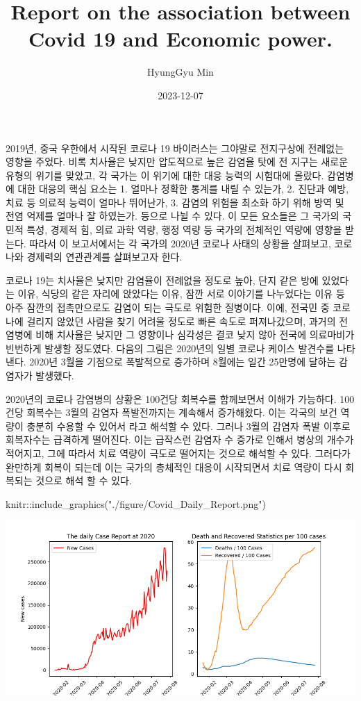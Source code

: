 \documentclass[
]{article}
\title{Report on the association between Covid 19 and Economic power.}
\author{HyungGyu Min}
\date{2023-12-07}
\newenvironment{Shaded}{\begin{snugshade}}{\end{snugshade}}
\newcommand{\FunctionTok}[1]{\textcolor[rgb]{0.00,0.00,0.00}{#1}}
\newcommand{\NormalTok}[1]{#1}
\newcommand{\SpecialCharTok}[1]{\textcolor[rgb]{0.00,0.00,0.00}{#1}}
\newcommand{\StringTok}[1]{\textcolor[rgb]{0.31,0.60,0.02}{#1}}
\begin{document}
\maketitle

2019년, 중국 우한에서 시작된 코로나 19 바이러스는 그야말로 전지구상에
전례없는 영향을 주었다. 비록 치사율은 낮지만 압도적으로 높은 감염율 탓에
전 지구는 새로운 유형의 위기를 맞았고, 각 국가는 이 위기에 대한 대응
능력의 시험대에 올랐다. 감염병에 대한 대응의 핵심 요소는 1. 얼마나
정확한 통계를 내릴 수 있는가, 2. 진단과 예방, 치료 등 의료적 능력이
얼마나 뛰어난가, 3. 감염의 위험을 최소화 하기 위해 방역 및 전염 억제를
얼마나 잘 하였는가. 등으로 나뉠 수 있다. 이 모든 요소들은 그 국가의
국민적 특성, 경제적 힘, 의료 과학 역량, 행정 역량 등 국가의 전체적인
역량에 영향을 받는다. 따라서 이 보고서에서는 각 국가의 2020년 코로나
사태의 상황을 살펴보고, 코로나와 경제력의 연관관계를 살펴보고자 한다.

코로나 19는 치사율은 낮지만 감염율이 전례없을 정도로 높아, 단지 같은
방에 있었다는 이유, 식당의 같은 자리에 앉았다는 이유, 잠깐 서로 이야기를
나누었다는 이유 등 아주 잠깐의 접촉만으로도 감염이 되는 극도로 위험한
질병이다. 이에, 전국민 중 코로나에 걸리지 않았던 사람을 찾기 어려울
정도로 빠른 속도로 퍼져나갔으며, 과거의 전염병에 비해 치사율은 낮지만 그
영향이나 심각성은 결코 낮지 않아 전국에 의료마비가 빈번하게 발생할
정도였다. 다음의 그림은 2020년의 일별 코로나 케이스 발견수를 나타낸다.
2020년 3월을 기점으로 폭발적으로 증가하며 8월에는 일간 25만명에 달하는
감염자가 발생했다.

2020년의 코로나 감염병의 상황은 100건당 회복수를 함께보면서 이해가
가능하다. 100건당 회복수는 3월의 감염자 폭발전까지는 계속해서
증가해왔다. 이는 각국의 보건 역량이 충분히 수용할 수 있어서 라고 해석할
수 있다. 그러나 3월의 감염자 폭발 이후로 회복자수는 급격하게 떨어진다.
이는 급작스런 감염자 수 증가로 인해서 병상의 개수가 적어지고, 그에
따라서 치료 역량이 극도로 떨어지는 것으로 해석할 수 있다. 그러다가
완만하게 회복이 되는데 이는 국가의 총체적인 대응이 시작되면서 치료
역량이 다시 회복되는 것으로 해석 할 수 있다.

\begin{Shaded}
\begin{Highlighting}[]
\NormalTok{knitr}\SpecialCharTok{::}\FunctionTok{include\_graphics}\NormalTok{(}\StringTok{"./figure/Covid\_Daily\_Report.png"}\NormalTok{) }
\end{Highlighting}
\end{Shaded}

\includegraphics[width=13.89in]{./figure/Covid_Daily_Report}
\end{document}
